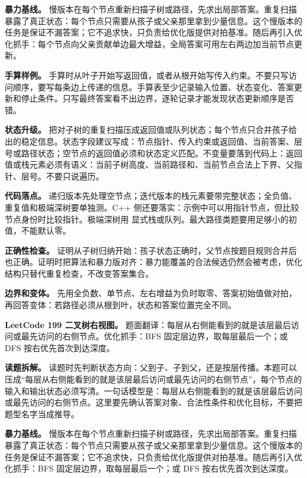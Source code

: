\textbf{暴力基线。} 慢版本在每个节点重新扫描子树或路径，先求出局部答案。重复扫描暴露了真正状态：每个节点只需要从孩子或父亲那里拿到少量信息。这个慢版本的任务是保证不漏答案；它不追求快，只负责给优化版提供对拍基准。随后再引入优化抓手：每个节点向父亲贡献单边最大增益，全局答案可用左右两边加当前节点更新。

\textbf{手算样例。} 手算时从叶子开始写返回值，或者从根开始写传入约束。不要只写访问顺序，要写每条边上传递的信息。手算表至少记录输入位置、状态变化、答案更新和停止条件。只写最终答案看不出边界，逐轮记录才能发现状态更新顺序是否错。

\textbf{状态升级。} 把对子树的重复扫描压成返回值或队列状态；每个节点只合并孩子给出的稳定信息。状态字段建议写成：节点指针、传入约束或返回值、当前答案、层号或路径状态；空节点的返回值必须和状态定义匹配。不变量要落到代码上：返回值或栈元素必须有语义：当前子树高度、当前路径和、当前节点合法上下界、父指针、层号。不要只说遍历。

\textbf{代码落点。} 递归版本先处理空节点；迭代版本的栈元素要带完整状态；全负值、重复值和极端深树要单独测。C++ 侧还要落实：示例中可以用指针节点，但比较节点身份时比较指针。极端深树用  显式栈或队列。最大路径类题要用足够小的初值，不能默认零。

\textbf{正确性检查。} 证明从子树归纳开始：孩子状态正确时，父节点按题目规则合并后也正确。证明时把算法和暴力版对齐：暴力能覆盖的合法候选仍然会被考虑，优化结构只替代重复检查，不改变答案集合。

\textbf{边界和变体。} 先用全负数、单节点、左右增益为负时取零、答案初始值做对拍，再回答变体：若路径必须从根到叶，状态和答案位置完全不同。

\noindent\textbf{LeetCode 199 二叉树右视图。} 题面翻译：每层从右侧能看到的就是该层最后访问或最先访问的右侧节点。优化抓手：BFS 固定层边界，取每层最后一个；或 DFS 按右优先首次到达深度。

\textbf{读题拆解。} 读题时先判断状态方向：父到子、子到父，还是按层传播。本题可以压成“每层从右侧能看到的就是该层最后访问或最先访问的右侧节点”，每个节点的输入和输出状态必须写清。一句话模型是：每层从右侧能看到的就是该层最后访问或最先访问的右侧节点。这里要先确认答案对象、合法性条件和优化目标，不要把题型名字当成推导。

\textbf{暴力基线。} 慢版本在每个节点重新扫描子树或路径，先求出局部答案。重复扫描暴露了真正状态：每个节点只需要从孩子或父亲那里拿到少量信息。这个慢版本的任务是保证不漏答案；它不追求快，只负责给优化版提供对拍基准。随后再引入优化抓手：BFS 固定层边界，取每层最后一个；或 DFS 按右优先首次到达深度。

